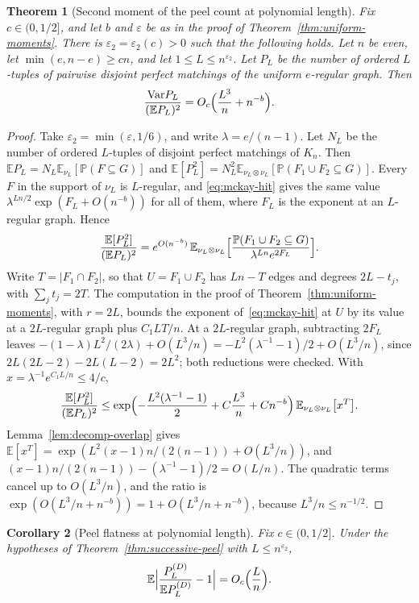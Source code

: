 \documentclass[11pt]{article}
\newtheorem{theorem}{Theorem}
\newtheorem{corollary}[theorem]{Corollary}
\newcommand{\EE}{\mathbb{E}}
\newcommand{\PP}{\mathbb{P}}
\newcommand{\Var}{\mathrm{Var}}
\begin{document}
\begin{theorem}[Second moment of the peel count at polynomial length]
\label{thm:peel-second-moment}
Fix \(c\in(0,1/2]\), and let \(b\) and \(\varepsilon\) be as in the proof of
Theorem~\ref{thm:uniform-moments}.
There is \(\varepsilon_2=\varepsilon_2(c)>0\) such that the following holds.
Let \(n\) be even, let \(\min(e,n-e)\ge cn\), and let \(1\le L\le n^{\varepsilon_2}\).
Let \(P_L\) be the number of ordered \(L\)-tuples of pairwise disjoint perfect
matchings of the uniform \(e\)-regular graph. Then
\[
\frac{\Var P_L}{(\EE P_L)^2}=O_c\Bigl(\frac{L^3}{n}+n^{-b}\Bigr).
\]
\end{theorem}

\begin{proof}
Take \(\varepsilon_2=\min(\varepsilon,1/6)\), and write \(\lambda=e/(n-1)\).
Let \(N_L\) be the number of ordered \(L\)-tuples of disjoint perfect
matchings of \(K_n\).
Then \(\EE P_L=N_L\EE_{\nu_L}[\PP(F\subseteq G)]\) and
\(\EE[P_L^2]=N_L^2\EE_{\nu_L\otimes\nu_L}[\PP(F_1\cup F_2\subseteq G)]\).
Every \(F\) in the support of \(\nu_L\) is \(L\)-regular, and
\eqref{eq:mckay-hit} gives the same value
\(\lambda^{Ln/2}\exp(F_L+O(n^{-b}))\) for all of them, where \(F_L\) is the
exponent at an \(L\)-regular graph. Hence
\[
\frac{\EE[P_L^2]}{(\EE P_L)^2}
=
e^{O(n^{-b})}\,
\EE_{\nu_L\otimes\nu_L}\Bigl[\frac{\PP(F_1\cup F_2\subseteq G)}{\lambda^{Ln}e^{2F_L}}\Bigr].
\]
Write \(T=|F_1\cap F_2|\), so that \(U=F_1\cup F_2\) has \(Ln-T\) edges and
degrees \(2L-t_j\), with \(\sum_jt_j=2T\).
The computation in the proof of Theorem~\ref{thm:uniform-moments}, with
\(r=2L\), bounds the exponent of~\eqref{eq:mckay-hit} at \(U\) by its value
at a \(2L\)-regular graph plus \(C_1LT/n\).
At a \(2L\)-regular graph, subtracting \(2F_L\) leaves
\(-(1-\lambda)L^2/(2\lambda)+O(L^3/n)=-L^2(\lambda^{-1}-1)/2+O(L^3/n)\),
since \(2L(2L-2)-2L(L-2)=2L^2\); both reductions were checked.
With \(x=\lambda^{-1}e^{C_1L/n}\le4/c\),
\[
\frac{\EE[P_L^2]}{(\EE P_L)^2}
\le
\exp\Bigl(-\frac{L^2(\lambda^{-1}-1)}2+C\frac{L^3}n+Cn^{-b}\Bigr)\,
\EE_{\nu_L\otimes\nu_L}\bigl[x^{T}\bigr].
\]
Lemma~\ref{lem:decomp-overlap} gives
\(\EE[x^{T}]=\exp(L^2(x-1)n/(2(n-1))+O(L^3/n))\), and
\((x-1)n/(2(n-1))-(\lambda^{-1}-1)/2=O(L/n)\).
The quadratic terms cancel up to \(O(L^3/n)\), and the ratio is
\(\exp(O(L^3/n+n^{-b}))=1+O(L^3/n+n^{-b})\), because \(L^3/n\le n^{-1/2}\).
\end{proof}

\begin{corollary}[Peel flatness at polynomial length]
\label{cor:poly-peel-flat}
Fix \(c\in(0,1/2]\).
Under the hypotheses of Theorem~\ref{thm:successive-peel} with
\(L\le n^{\varepsilon_2}\),
\[
\EE\Bigl|\frac{P_L^{(D)}}{\EE P_L^{(D)}}-1\Bigr|=O_c\Bigl(\frac Ln\Bigr).
\]
\end{corollary}
\end{document}
